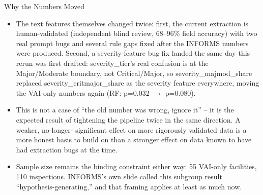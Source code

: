 \documentclass[aspectratio=169,10pt]{beamer}
\begin{document}
\begin{frame}{Why the Numbers Moved}
\begin{itemize}
  \setlength{\itemsep}{10pt}
  \item The text features themselves changed twice: first, the current extraction is
        human-validated (independent blind review, 68--96\% field accuracy) with two real prompt
        bugs and several rule gaps fixed after the INFORMS numbers were produced. Second, a
        severity-feature bug fix landed the same day this rerun was first drafted:
        severity\_tier's real confusion is at the Major/Moderate boundary, not Critical/Major, so
        severity\_majmod\_share replaced severity\_critmajor\_share as the severity feature
        everywhere, moving the VAI-only numbers again (RF: p=0.032 $\to$ p=0.080).
  \item This is not a case of ``the old number was wrong, ignore it'' -- it is the expected
        result of tightening the pipeline twice in the same direction. A weaker, no-longer-
        significant effect on more rigorously validated data is a more honest basis to build on
        than a stronger effect on data known to have had extraction bugs at the time.
  \item Sample size remains the binding constraint either way: 55 VAI-only facilities, 110
        inspections. INFORMS's own slide called this subgroup result ``hypothesis-generating,''
        and that framing applies at least as much now.
\end{itemize}
\end{frame}
\end{document}
